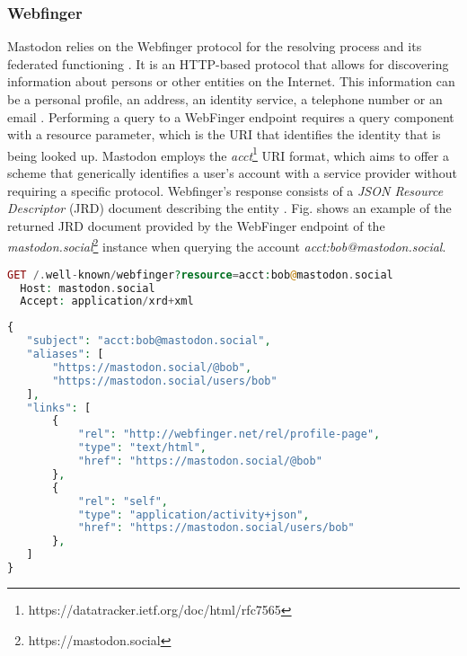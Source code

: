 \subsubsection*{\textbf{Webfinger}}
Mastodon relies on the Webfinger protocol for the resolving process and its federated functioning \cite{rochko_2020}. It is an HTTP-based protocol that allows for discovering information about persons or other entities on the Internet. This information can be a personal profile, an address, an identity service, a telephone number or an email \cite{jones_salgueiro_jones_smarr_2013}. Performing a query to a WebFinger endpoint requires a query component with a resource parameter, which is the URI that identifies the identity that is being looked up. Mastodon employs the \emph{acct}\footnote{https://datatracker.ietf.org/doc/html/rfc7565} URI format, which aims to offer a scheme that generically identifies a user's account with a service provider without requiring a specific protocol. Webfinger's response consists of a \emph{JSON Resource Descriptor} (JRD) document describing the entity \cite{jones_salgueiro_jones_smarr_2013}. Fig. \label{Webfinger response from mastodon.social} shows an example of the returned JRD document provided by the WebFinger endpoint of the \emph{mastodon.social}\footnote{https://mastodon.social} instance when querying the account \emph{acct:bob@mastodon.social}.

\lstset{style=JSONStyle}
\begin{lstlisting}[language=PHP, caption=HTTP request to Webfinger endpoint, label=Webfinger request, float=h]
  GET /.well-known/webfinger?resource=acct:bob@mastodon.social
  Host: mastodon.social
  Accept: application/xrd+xml
\end{lstlisting}

\lstset{style=JSONStyle}
\begin{lstlisting}[language=PHP, caption=Webfinger response, label=Webfinger response from mastodon.social, float=h]
{
   "subject": "acct:bob@mastodon.social",
   "aliases": [
       "https://mastodon.social/@bob",
       "https://mastodon.social/users/bob"
   ],
   "links": [
       {
           "rel": "http://webfinger.net/rel/profile-page",
           "type": "text/html",
           "href": "https://mastodon.social/@bob"
       },
       {
           "rel": "self",
           "type": "application/activity+json",
           "href": "https://mastodon.social/users/bob"
       },
   ]
}
\end{lstlisting}


\pagebreak
